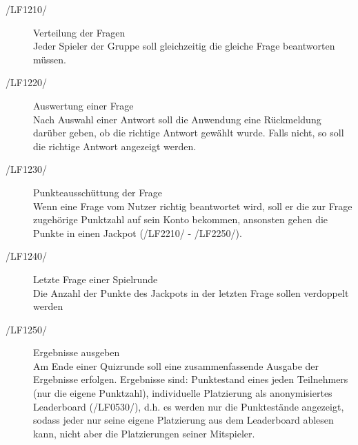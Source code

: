 \documentclass[11pt,a4paper]{scrreprt}
\begin{document}
\begin{description}
\item[/LF1210/]Verteilung der Fragen \\
Jeder Spieler der Gruppe soll gleichzeitig die gleiche Frage beantworten müssen.

\item[/LF1220/]Auswertung einer Frage \\ 
Nach Auswahl einer Antwort soll die Anwendung eine Rückmeldung darüber geben, ob die richtige Antwort gewählt wurde. Falls nicht, so soll die richtige Antwort angezeigt werden.
 
\item[/LF1230/]Punkteausschüttung der Frage \\
Wenn eine Frage vom Nutzer richtig beantwortet wird, soll er die zur Frage zugehörige Punktzahl auf sein Konto bekommen, ansonsten gehen die Punkte in einen Jackpot (/LF2210/ - /LF2250/).

\item[/LF1240/] Letzte Frage einer Spielrunde \\
Die Anzahl der Punkte des Jackpots in der letzten Frage sollen verdoppelt werden

\item[/LF1250/] Ergebnisse ausgeben \\
Am Ende einer Quizrunde soll eine zusammenfassende Ausgabe der Ergebnisse erfolgen. Ergebnisse sind: Punktestand eines jeden Teilnehmers (nur die eigene Punktzahl),  individuelle Platzierung als anonymisiertes Leaderboard (/LF0530/), d.h. es werden nur die Punktestände angezeigt, sodass jeder nur seine eigene Platzierung aus dem Leaderboard ablesen kann, nicht aber die Platzierungen seiner Mitspieler.
\end{description}
\end{document}
